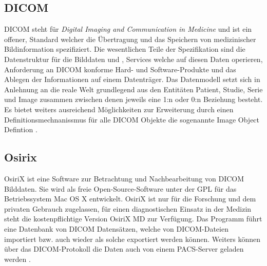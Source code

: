 \subsection{DICOM}
\label{sec:DICOM}
DICOM steht für \emph{Digital Imaging and Communication in Medicine} und ist ein offener,
Standard welcher die Übertragung und das Speichern von medizinischer Bildinformation spezifiziert.
Die wesentlichen Teile der Spezifikation sind die Datenstruktur für die Bilddaten und  , 
Services welche auf diesen Daten operieren, Anforderung an DICOM konforme Hard- und Software-Produkte und das Ablegen der Informationen auf einem Datenträger.
Das Datenmodell setzt sich in Anlehnung an die reale Welt grundlegend aus den Entitäten Patient, Studie, Serie und Image zusammen zwischen denen jeweils eine 1:n oder 0:n Beziehung besteht.
Es bietet weiters ausreichend Möglichkeiten zur Erweiterung durch einen Definitionsmechnanissmus für alle DICOM Objekte die sogenannte Image Object Defintion \cite{pacs}.

\subsection{Osirix}
\label{sec:Osirix}
OsiriX ist eine Software zur Betrachtung und Nachbearbeitung von DICOM Bilddaten.
Sie wird als freie Open-Source-Software unter der GPL für das Betriebssystem Mac OS X entwickelt.
OsiriX ist nur für die Forschung und dem privaten Gebrauch zugelassen, 
für einen diagnostischen Einsatz in der Medizin steht die kostenpflichtige Version OsiriX MD zur Verfügung.
%
Das Programm führt eine Datenbank von DICOM Datensätzen, 
welche von DICOM-Dateien importiert bzw. auch wieder als solche exportiert werden können.
Weiters können über das DICOM-Protokoll die Daten auch von einem PACS-Server geladen werden \cite{osirix}.

